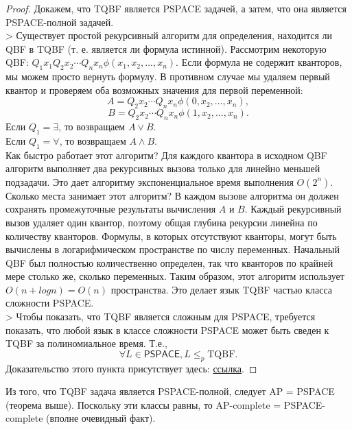     \begin{proof}
        Докажем, что TQBF является PSPACE задачей, а затем, что она является PSPACE-полной задачей.\\
        > Существует простой рекурсивный алгоритм для определения, находится ли QBF в TQBF (т. е. является ли формула истинной). Рассмотрим некоторую QBF:
        $Q_{1}x_{1}Q_{2}x_{2}\cdots Q_{n}x_{n}\phi (x_{1},x_{2},\dots ,x_{n}).$
        Если формула не содержит кванторов, мы можем просто вернуть формулу. В противном случае мы удаляем первый квантор и проверяем оба возможных значения для первой переменной:
        $$A=Q_{2}x_{2}\cdots Q_{n}x_{n}\phi (0,x_{2},\dots ,x_{n}),$$
        $$B=Q_{2}x_{2}\cdots Q_{n}x_{n}\phi (1,x_{2},\dots ,x_{n}).$$
        Если $Q_{1}=\exists$, то возвращаем $A\lor B$.\\
        Если $Q_{1}=\forall$, то возвращаем $A\land B$.\\
        Как быстро работает этот алгоритм? Для каждого квантора в исходном QBF алгоритм выполняет два рекурсивных вызова только для линейно меньшей подзадачи. Это дает алгоритму экспоненциальное время выполнения $O(2^n)$.\\
        Сколько места занимает этот алгоритм? В каждом вызове алгоритма он должен сохранять промежуточные результаты вычисления $A$ и $B$. Каждый рекурсивный вызов удаляет один квантор, поэтому общая глубина рекурсии линейна по количеству кванторов. Формулы, в которых отсутствуют кванторы, могут быть вычислены в логарифмическом пространстве по числу переменных. Начальный QBF был полностью количественно определен, так что кванторов по крайней мере столько же, сколько переменных. Таким образом, этот алгоритм использует $O(n + log n) = O(n)$ пространства. Это делает язык TQBF частью класса сложности PSPACE.\\
        > Чтобы показать, что TQBF является сложным для PSPACE, требуется показать, что любой язык в классе сложности PSPACE может быть сведен к TQBF за полиномиальное время. Т.е.,
        $$\forall L\in {\mathsf{PSPACE}},L\leq _{p}\mathrm{TQBF} .$$
        Доказательство этого пункта присутствует здесь: \href{https://en.wikipedia.org/wiki/True_quantified_Boolean_formula}{ссылка}.
    \end{proof}
    \begin{Rem}
        Из того, что TQBF задача является PSPACE-полной, следует AP = PSPACE (теорема выше). Поскольку эти классы равны, то AP-complete = PSPACE-complete (вполне очевидный факт).
    \end{Rem}

